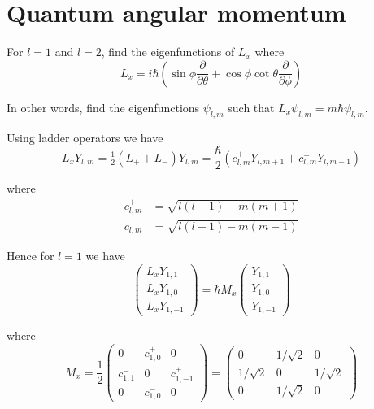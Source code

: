 

\section*{Quantum angular momentum}

For $l=1$ and $l=2$, find the eigenfunctions of $L_x$ where
\begin{equation*}
L_x=i\hbar\left(
\sin\phi\frac{\partial}{\partial\theta}+\cos\phi\cot\theta\frac{\partial}{\partial\phi}
\right)
\end{equation*}

In other words, find the eigenfunctions $\psi_{l,m}$ such that $L_x\psi_{l,m}=m\hbar\psi_{l,m}$.

\bigskip
Using ladder operators we have
\begin{equation*}
L_xY_{l,m}=\tfrac{1}{2}(L_++L_-)Y_{l,m}
=\frac{\hbar}{2}\left(c_{l,m}^+Y_{l,m+1}+c_{l,m}^-Y_{l,m-1}\right)
\end{equation*}

where
\begin{align*}
c_{l,m}^+&=\sqrt{l(l+1)-m(m+1)}
\\
c_{l,m}^-&=\sqrt{l(l+1)-m(m-1)}
\end{align*}

Hence for $l=1$ we have
\begin{equation*}
\begin{pmatrix}L_xY_{1,1}\\[1ex]L_xY_{1,0}\\[1ex]L_xY_{1,-1}\end{pmatrix}
=
\hbar M_x\begin{pmatrix}Y_{1,1}\\[1ex]Y_{1,0}\\[1ex]Y_{1,-1}\end{pmatrix}
\end{equation*}

where
\begin{equation*}
M_x=\frac{1}{2}\begin{pmatrix}
0 & c_{1,0}^+ & 0
\\[1ex]
c_{1,1}^- & 0 & c_{1,-1}^+
\\[1ex]
0 & c_{1,0}^- & 0
\end{pmatrix}
=
\begin{pmatrix}
0 & 1/\sqrt2 & 0
\\[1ex]
1/\sqrt2 & 0 & 1/\sqrt2
\\[1ex]
0 & 1/\sqrt2 & 0
\end{pmatrix}
\end{equation*}

